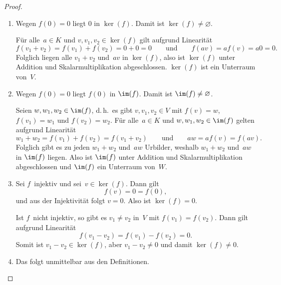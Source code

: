 \documentclass[a4paper]{article}
\begin{document}
\begin{proof}\leavevmode
    \begin{enumerate}
        \item Wegen $f(0) = 0$ liegt $0$ in $\ker(f)$. Damit ist $\ker(f) \neq \varnothing$.
        
        Für alle~$a \in K$ und $v,v_1,v_2 \in \ker(f)$ gilt aufgrund Linearität
        \begin{equation*}
            f(v_1+v_2) = f(v_1)+f(v_2) = 0+0 = 0 \qquad\text{und}\qquad f(av) = af(v) = a0 = 0.
        \end{equation*}
        Folglich liegen alle $v_1+v_2$ und~$av$ in $\ker(f)$, also ist $\ker(f)$ unter Addition und Skalarmultiplikation abgeschlossen. $\ker(f)$ ist ein Unterraum von~$V$.
        \item Wegen $f(0) = 0$ liegt $f(0)$ in $\im(f)$. Damit ist $\im(f) \neq \varnothing$.
        
        Seien $w,w_1,w_2 \in \im(f)$, d.\,h.\ es gibt $v,v_1,v_2 \in V$ mit $f(v) = w$, $f(v_1) = w_1$ und $f(v_2) = w_2$. Für alle~$a \in K$ und $w,w_1,w_2 \in \im(f)$ gelten aufgrund Linearität
        \begin{equation*}
            w_1+w_2 = f(v_1)+f(v_2) = f(v_1+v_2) \qquad\text{und}\qquad aw = af(v) = f(av).
        \end{equation*}
        Folglich gibt es zu jeden $w_1+w_2$ und~$aw$ Urbilder, weshalb $w_1+w_2$ und~$aw$ in $\im(f)$ liegen. Also ist $\im(f)$ unter Addition und Skalarmultiplikation abgeschlossen und $\im(f)$ ein Unterraum von~$W$.
        \item Sei $f$~injektiv und sei~$v \in \ker(f)$. Dann gilt
        \begin{equation*}
            f(v) = 0 = f(0),
        \end{equation*}
        und aus der Injektivität folgt $v = 0$. Also ist $\ker(f) = 0$.

        Ist $f$~nicht injektiv, so gibt es $v_1 \neq v_2$ in~$V$ mit $f(v_1) = f(v_2)$. Dann gilt aufgrund Linearität
        \begin{equation*}
            f(v_1-v_2) = f(v_1)-f(v_2) = 0.
        \end{equation*}
        Somit ist $v_1-v_2 \in \ker(f)$, aber $v_1-v_2 \neq 0$ und damit $\ker(f) \neq 0$.
        \item Das folgt unmittelbar aus den Definitionen.\qedhere
    \end{enumerate}
\end{proof}
\end{document}

